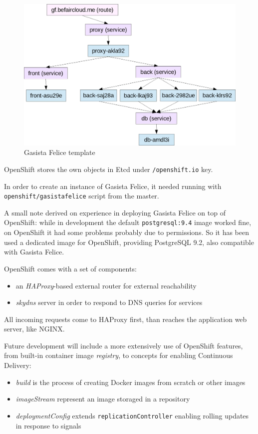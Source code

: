 \begin{figure}[htbp]
\centering
\includegraphics{media/ch5-template-gf.png}
\caption{Gasista Felice template}
\end{figure}

OpenShift stores the own objects in Etcd under \texttt{/openshift.io} key.

In order to create an instance of Gasista Felice, it needed running with \texttt{openshift/gasistafelice} script from the master.

A small note derived on experience in deploying Gasista Felice on top of OpenShift:  while in development the default \texttt{postgresql:9.4} image worked fine, on OpenShift it had some problems probably due to permissions. So it has been used a dedicated image for OpenShift, providing PostgreSQL 9.2, also compatible with Gasista Felice.

OpenShift comes with a set of components:

\begin{itemize}
\item an \textit{HAProxy}-based external router for external reachability
\item \textit{skydns} server in order to respond to DNS queries for services
\end{itemize}

All incoming requests come to HAProxy first, than reaches the application web server, like NGINX.

Future development will include a more extensively use of OpenShift features, from built-in container image \textit{registry}, to concepts for enabling Continuous Delivery:

\begin{itemize}
\item \textit{build} is the process of creating Docker images from scratch or other images
\item \textit{imageStream} represent an image storaged in a repository
\item \textit{deploymentConfig} extends \texttt{replicationController} enabling rolling updates in response to signals
\end{itemize}

